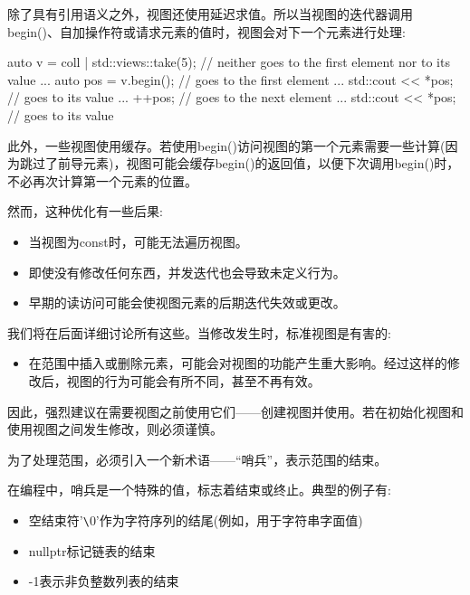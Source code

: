 
除了具有引用语义之外，视图还使用延迟求值。所以当视图的迭代器调用begin()、自加操作符或请求元素的值时，视图会对下一个元素进行处理:

\begin{cpp}
auto v = coll | std::views::take(5); // neither goes to the first element nor to its value
...
auto pos = v.begin(); // goes to the first element
...
std::cout << *pos; // goes to its value
...
++pos; // goes to the next element
...
std::cout << *pos; // goes to its value
\end{cpp}


此外，一些视图使用缓存。若使用begin()访问视图的第一个元素需要一些计算(因为跳过了前导元素)，视图可能会缓存begin()的返回值，以便下次调用begin()时，不必再次计算第一个元素的位置。

然而，这种优化有一些后果:

\begin{itemize}
\item
当视图为const时，可能无法遍历视图。

\item
即使没有修改任何东西，并发迭代也会导致未定义行为。

\item
早期的读访问可能会使视图元素的后期迭代失效或更改。
\end{itemize}

我们将在后面详细讨论所有这些。当修改发生时，标准视图是有害的:

\begin{itemize}
\item
在范围中插入或删除元素，可能会对视图的功能产生重大影响。经过这样的修改后，视图的行为可能会有所不同，甚至不再有效。
\end{itemize}

因此，强烈建议在需要视图之前使用它们——创建视图并使用。若在初始化视图和使用视图之间发生修改，则必须谨慎。


为了处理范围，必须引入一个新术语——“哨兵”，表示范围的结束。

在编程中，哨兵是一个特殊的值，标志着结束或终止。典型的例子有:

\begin{itemize}
\item
空结束符'\verb|\|0'作为字符序列的结尾(例如，用于字符串字面值)

\item
nullptr标记链表的结束

\item
-1表示非负整数列表的结束
\end{itemize}

